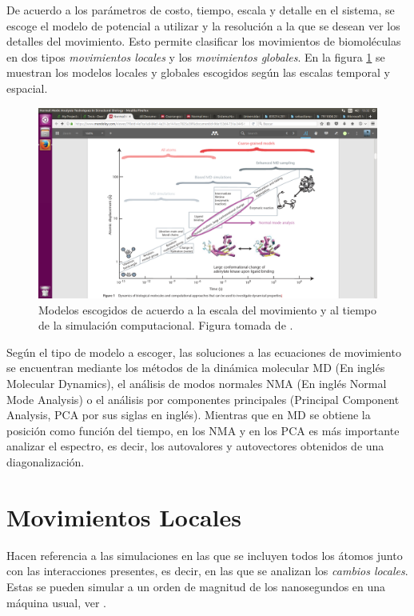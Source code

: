 De acuerdo a los par\'{a}metros de costo, tiempo, escala y detalle en el sistema, se escoge el modelo de potencial a utilizar y la resoluci\'{o}n a la que se desean ver los detalles del movimiento. Esto permite clasificar los movimientos de biomol\'{e}culas en dos tipos \textit{movimientos locales} y los \textit{movimientos globales}. En la figura \ref{fig:esc} se muestran los modelos locales y globales escogidos seg\'{u}n las escalas temporal y espacial.\\
\begin{figure}[h]
\centering%
\includegraphics[trim={10cm 1cm 8cm 10cm},clip,scale=0.3]{Kap2/escalas.png}%
\caption{Modelos escogidos de acuerdo a la escala del movimiento y al tiempo de la simulaci\'{o}n computacional. Figura tomada de  \cite{Ramon}.} \label{fig:esc}
\end{figure}


Seg\'{u}n el tipo de modelo a escoger, las soluciones a las ecuaciones de movimiento se encuentran mediante los m\'{e}todos de la din\'{a}mica molecular MD (En ingl\'{e}s Molecular Dynamics), el an\'{a}lisis de modos normales NMA (En ingl\'{e}s Normal Mode Analysis) o el an\'{a}lisis por componentes principales (Principal Component Analysis, PCA por sus siglas en ingl\'{e}s). Mientras que en MD se obtiene la posici\'{o}n como funci\'{o}n del tiempo, en los NMA y en los PCA  es m\'{a}s importante analizar el espectro, es decir, los autovalores y autovectores obtenidos de una diagonalizaci\'{o}n.\\

\section{Movimientos Locales}
Hacen referencia a las simulaciones en las que se incluyen todos los \'{a}tomos junto con las interacciones presentes, es decir, en las que se analizan los \textit{cambios locales}. Estas se pueden simular a un orden de magnitud de los nanosegundos en una m\'{a}quina usual, ver \cite{Gur2013}.\\

